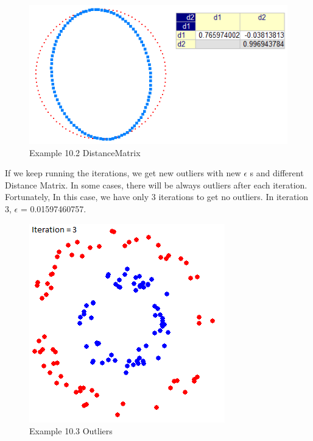 \documentclass[]{article}
\begin{document}
\begin{figure}[htbp]
\begin{center}
\includegraphics[scale=0.7]{Example_10_2_DistanceMatrix_1.PNG}
\caption{Example 10.2 DistanceMatrix}
\label{fig:Example_10_2_DistanceMatrix_1}
\end{center}
\end{figure}


\newpage
If we keep running the iterations, we get new outliers with new $\epsilon$ s and different Distance Matrix. In some cases, there will be always outliers after each iteration. Fortunately, In this case, we have only 3 iterations to get no outliers. In iteration 3, $\epsilon$ = 0.01597460757.

\begin{figure}[htbp]
\begin{center}
\includegraphics[scale=0.7]{Example_10_3_outliers_1.PNG}
\caption{Example 10.3 Outliers}
\label{fig:Example_10_3_outliers_1}
\end{center}
\end{figure}
\end{document}
